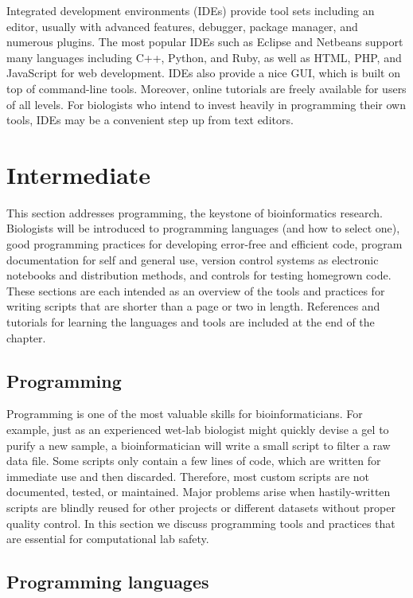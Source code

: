 \documentclass[ChapterTOCs,krantz2]{krantz} %
\begin{document}
Integrated development environments (IDEs) provide tool sets
including an editor, usually with advanced features, debugger, package manager,
and numerous plugins. The most popular IDEs such as 
Eclipse and Netbeans support many languages including
C++, Python, and Ruby, as well as HTML, PHP, and JavaScript for web
development. IDEs also provide a nice GUI, which is built on
top of command-line tools.  Moreover, 
online tutorials are freely available for users of all levels.  For biologists who 
intend to invest heavily in programming their own tools, IDEs may be a convenient step 
up from text editors.

\section{Intermediate} This section addresses programming, the keystone of
bioinformatics research.  Biologists will be introduced to 
programming languages (and how to select one), good programming practices for
developing error-free and efficient code, program documentation for self and
general use, version control systems as electronic notebooks
and distribution methods, and controls for testing homegrown code.  These
sections are each intended as an overview of the tools and practices for
writing scripts that are shorter than a page or two in length.  References and
tutorials for learning the languages and tools are included at the end of the
chapter. 

\subsection{Programming} Programming is one of the most valuable skills for 
bioinformaticians. For example, just
as an experienced wet-lab biologist might quickly devise a gel to
purify a new sample, a bioinformatician will write a small
script to filter a raw data file. Some scripts only contain a few
lines of code, which are written for immediate use and then discarded.  
Therefore, most custom scripts are not documented, tested, or 
maintained.  Major problems arise when hastily-written scripts are blindly
reused for other projects or different datasets without proper quality control.  In
this section we discuss programming tools and practices that are 
essential for computational lab safety. 

\subsection{Programming languages}
\end{document}
